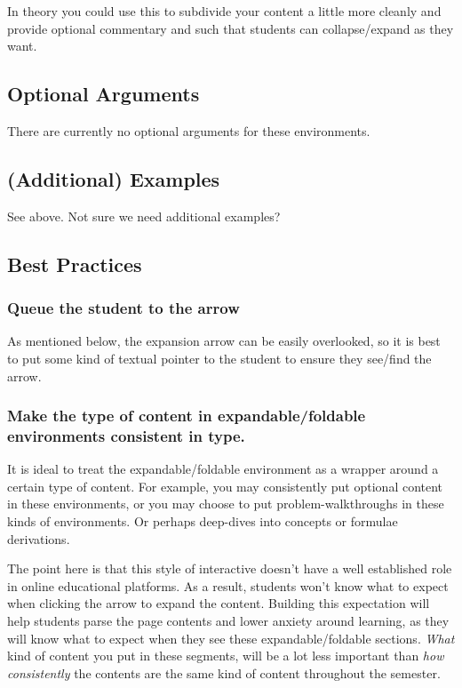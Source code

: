 \documentclass{ximera}
\begin{document}
        In theory you could use this to subdivide your content a little more cleanly and provide optional commentary and such that students can collapse/expand as they want. 
        
    \subsection*{Optional Arguments}
        There are currently no optional arguments for these environments.

    \subsection*{(Additional) Examples}
    
        See above. Not sure we need additional examples?
        
    \subsection*{Best Practices}
    
        \subsubsection*{Queue the student to the arrow}
            As mentioned below, the expansion arrow can be easily overlooked, so it is best to put some kind of textual pointer to the student to ensure they see/find the arrow.
        
        \subsubsection*{Make the type of content in expandable/foldable environments consistent in type.}
            It is ideal to treat the expandable/foldable environment as a wrapper around a certain type of content. For example, you may consistently put optional content in these environments, or you may choose to put problem-walkthroughs in these kinds of environments. Or perhaps deep-dives into concepts or formulae derivations.
            
            The point here is that this style of interactive doesn't have a well established role in online educational platforms. As a result, students won't know what to expect when clicking the arrow to expand the content. Building this expectation will help students parse the page contents and lower anxiety around learning, as they will know what to expect when they see these expandable/foldable sections. \textit{What} kind of content you put in these segments, will be a lot less important than \textit{how consistently} the contents are the same kind of content throughout the semester.
    
\end{document}
